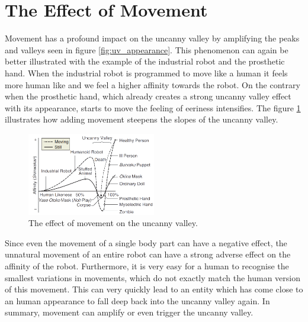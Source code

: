 \section{The Effect of Movement}
Movement has a profound impact on the uncanny valley by amplifying the peaks and valleys seen in figure \ref{fig:uv_appearance}. This phenomenon can again be better illustrated with the example of the industrial robot and the prosthetic hand. When the industrial robot is programmed to move like a human it feels more human like and we feel a higher affinity towards the robot. On the contrary when the prosthetic hand, which already creates a strong uncanny valley effect with its appearance, starts to move the feeling of eeriness intensifies.
The figure \ref{fig:uv_movement} illustrates how adding movement steepens the slopes of the uncanny valley. \cite{6213238}\\
\begin{figure} %
    \centering
    \includegraphics[width=0.5\textwidth]{graphics/uv_movement.png}
    \caption{The effect of movement on the uncanny valley.}
    \label{fig:uv_movement}
\end{figure}
Since even the movement of a single body part can have a negative effect, the unnatural movement of an entire robot can have a strong adverse effect on the affinity of the robot. Furthermore, it is very easy for a human to recognise the smallest variations in movements, which do not exactly match the human version of this movement. This can very quickly lead to an entity which has come close to an human appearance to fall deep back into the uncanny valley again. In summary, movement can amplify or even trigger the uncanny valley. \cite{6213238}
